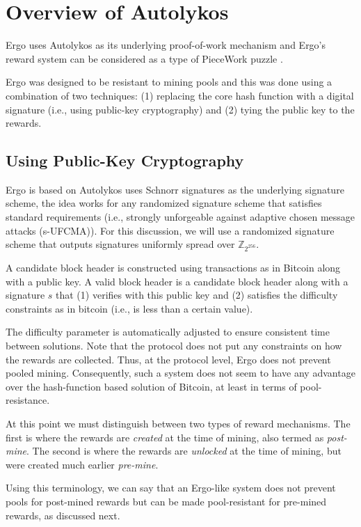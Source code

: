\documentclass[11pt]{article}
\newcommand{\authnote}[2]{\marginpar{\parbox{\marginparwidth}{\tiny %
  \textsf{#1 {\textcolor{blue}{notes: #2}}}}}%
  \textcolor{blue}{\textbf{\dag}}}
\newcommand{\authnote}[2]{
  \textsf{#1 \textcolor{blue}{: #2}}}
\newcommand{\authnote}[2]{}
\newcommand{\snote}[1]{{\authnote{\textcolor{yellow}{Scalahub notes}}{#1}}}
\newcommand{\powname}{Autolykos\xspace}
\begin{document}
\section{Overview of \powname}

Ergo uses \powname as its underlying proof-of-work mechanism and Ergo's reward system can be considered as a type of PieceWork puzzle \snote{Check validity of this statement}. 

Ergo was designed to be resistant to mining pools and this was done using a combination of two techniques: (1) replacing the core hash function with a digital signature (i.e., using public-key cryptography) and (2) tying the public key to the rewards. 

\subsection{Using Public-Key Cryptography}
Ergo is based on \powname uses Schnorr signatures as the underlying signature scheme, the idea works for any randomized signature scheme that satisfies standard requirements (i.e., strongly unforgeable against adaptive chosen message attacks (s-UFCMA)). For this discussion, we will use a randomized signature scheme that outputs signatures uniformly spread over $\mathbb{Z}_{2^{256}}$. 

A candidate block header is constructed using transactions as in Bitcoin along with a public key. A valid block header is a candidate block header along with a signature $s$ that (1) verifies with this public key and (2) satisfies the difficulty constraints as in bitcoin (i.e., is less than a certain value).

The difficulty parameter is automatically adjusted to ensure consistent time between solutions. Note that the protocol does not put any constraints on how the rewards are collected. Thus, at the protocol level, Ergo does not prevent pooled mining. Consequently, such a system does not seem to have any advantage over the hash-function based solution of Bitcoin, at least in terms of pool-resistance.

At this point we must distinguish between two types of reward mechanisms. The first is where the rewards are {\em created} at the time of mining, also termed as {\em post-mine}. The second is where the rewards are {\em unlocked} at the time of mining, but were created much earlier {\em pre-mine}. 

Using this terminology, we can say that an Ergo-like system does not prevent pools for post-mined rewards but can be made pool-resistant for pre-mined rewards, as discussed next.
\end{document}
